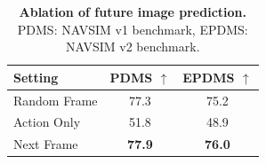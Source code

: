 \begin{table}[t] \small
\centering
\setlength{\tabcolsep}{16pt}
\caption{\textbf{Ablation of future image prediction.} 
PDMS: NAVSIM v1 \cite{navsim-v1} benchmark, EPDMS: NAVSIM v2 \cite{navsim-v2} benchmark. }
\vspace{-3mm}
\label{tab:ablation_frame}
        \begin{tabular}{l|c|c}
            \toprule
            \textbf{Setting} & \textbf{PDMS $\uparrow$} & \textbf{EPDMS  $\uparrow$}\\ 
            \midrule
            Random Frame & 77.3 & 75.2  \\ 
            Action Only & 51.8 & 48.9  \\ 
            Next Frame & \textbf{77.9} & \textbf{76.0} \\ 
            \bottomrule
        \end{tabular}
\end{table}
